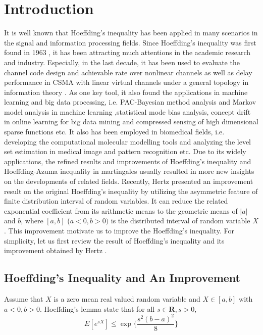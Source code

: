 \documentclass[journal]{IEEEtran}
\begin{document}
\section{Introduction}


It is well known that Hoeffding's inequality has been applied in many scenarios in the signal and information processing fields.
Since Hoeffding's inequality was first found in 1963 \cite{r2}, it has been attracting much attentions in the academic research \cite{r3} \cite{r4} and industry.  Especially, in the last decade, it has been used to evaluate the channel code design \cite{r5}\cite{r6} and achievable rate over nonlinear channels \cite{r7} as well as delay performance in CSMA with linear virtual channels under a general topology \cite{r8} in information theory \cite{r9}. As one key tool, it also found the applications in machine learning and big data processing, i.e. PAC-Bayesian method analysis and Markov model analysis in machine learning \cite{r10}\cite{r11},statistical mode bias analysis\cite{r12}, concept drift in online learning for big data mining \cite{r13} and compressed sensing of high dimensional sparse functions \cite{r14}etc. It also has been employed in biomedical fields, i.e. developing the computational molecular modelling tools \cite{r15} and analyzing the level set estimation in medical image and pattern recognition \cite{r16} etc. Due to its widely applications, the refined results and improvements of Hoeffding's inequality and Hoeffding-Azuma inequality in martingales usually resulted in more new insights on the developments of related fields.  Recently, Hertz \cite{r1} presented an improvement result on the original Hoeffding's inequality by utilizing the asymmetric feature of finite distribution interval of random variables. It can reduce the related exponential coefficient from its arithmetic means to the geometric means of $|a|$ and $b$, where $[a,b]$ ($a<0, b>0)$ is the distributed interval of random variable $X$. This improvement motivate us to improve the Hoeffding's inequality.  For simplicity, let us first review the result of Hoeffding's inequality \cite{r2} and its improvement obtained by Hertz \cite{r1}.


\subsection{Hoeffding's Inequality and An Improvement}
Assume that $X$ is a zero mean real valued random variable and $X\in [a, b]$ with $a<0,b>0$. Hoeffding's lemma state that for all $s\in \textbf{R}, s>0$,
\begin{equation}\label{hoeffding inequality}
  E[e^{sX}]\leq \exp\Big\{\frac{s^2 (b-a)^2}{8}\Big\}
\end{equation}
\end{document}
